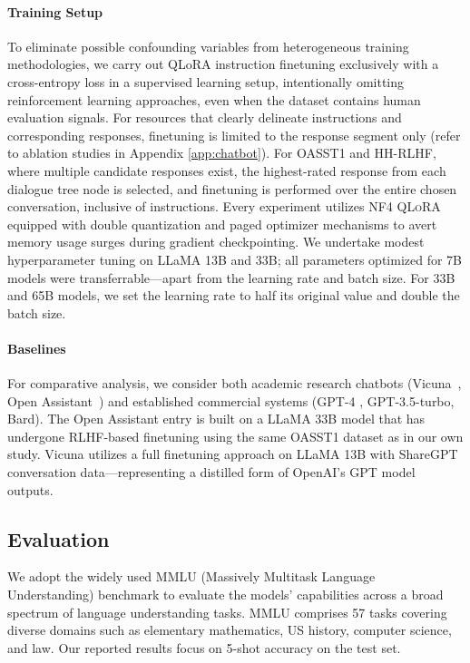\paragraph{Training Setup} To eliminate possible confounding variables from heterogeneous training methodologies, we carry out QLoRA instruction finetuning exclusively with a cross-entropy loss in a supervised learning setup, intentionally omitting reinforcement learning approaches, even when the dataset contains human evaluation signals. For resources that clearly delineate instructions and corresponding responses, finetuning is limited to the response segment only (refer to ablation studies in Appendix \ref{app:chatbot}). For OASST1 and HH-RLHF, where multiple candidate responses exist, the highest-rated response from each dialogue tree node is selected, and finetuning is performed over the entire chosen conversation, inclusive of instructions. Every experiment utilizes NF4 \textsc{QLoRA} equipped with double quantization and paged optimizer mechanisms to avert memory usage surges during gradient checkpointing. We undertake modest hyperparameter tuning on LLaMA 13B and 33B; all parameters optimized for 7B models were transferrable—apart from the learning rate and batch size. For 33B and 65B models, we set the learning rate to half its original value and double the batch size.

\paragraph{Baselines} For comparative analysis, we consider both academic research chatbots (Vicuna~\citep{vicuna2023}, Open Assistant~\citep{kopf2023openassistant}) and established commercial systems (GPT-4 \citep{openai2023gpt}, GPT-3.5-turbo, Bard). The Open Assistant entry is built on a LLaMA 33B model that has undergone RLHF-based finetuning using the same OASST1 dataset as in our own study. Vicuna utilizes a full finetuning approach on LLaMA 13B with ShareGPT conversation data—representing a distilled form of OpenAI’s GPT model outputs.

\subsection{Evaluation}

We adopt the widely used MMLU (Massively Multitask Language Understanding) benchmark \citep{hendrycksmeasuring} to evaluate the models’ capabilities across a broad spectrum of language understanding tasks. MMLU comprises 57 tasks covering diverse domains such as elementary mathematics, US history, computer science, and law. Our reported results focus on 5-shot accuracy on the test set.

